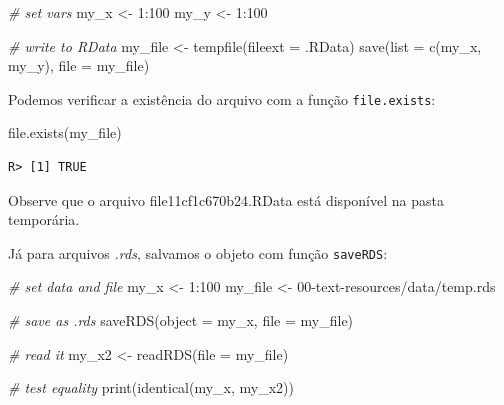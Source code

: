\documentclass[
  11pt,
]{book}
\newenvironment{Shaded}{\begin{snugshade}}{\end{snugshade}}
\newcommand{\AttributeTok}[1]{\textcolor[rgb]{0.61,0.61,0.61}{#1}}
\newcommand{\CommentTok}[1]{\textcolor[rgb]{0.37,0.37,0.37}{\textit{#1}}}
\newcommand{\DecValTok}[1]{\textcolor[rgb]{0.06,0.06,0.06}{#1}}
\newcommand{\FunctionTok}[1]{\textcolor[rgb]{0,0,0}{#1}}
\newcommand{\NormalTok}[1]{#1}
\newcommand{\OtherTok}[1]{\textcolor[rgb]{0.37,0.37,0.37}{#1}}
\newcommand{\SpecialCharTok}[1]{\textcolor[rgb]{0,0,0}{#1}}
\newcommand{\StringTok}[1]{\textcolor[rgb]{0.5,0.5,0.5}{#1}}
\begin{document}
\begin{Shaded}
\begin{Highlighting}[]
\CommentTok{\# set vars}
\NormalTok{my\_x }\OtherTok{\textless{}{-}} \DecValTok{1}\SpecialCharTok{:}\DecValTok{100}
\NormalTok{my\_y }\OtherTok{\textless{}{-}} \DecValTok{1}\SpecialCharTok{:}\DecValTok{100}

\CommentTok{\# write to RData}
\NormalTok{my\_file }\OtherTok{\textless{}{-}} \FunctionTok{tempfile}\NormalTok{(}\AttributeTok{fileext =} \StringTok{\textquotesingle{}.RData\textquotesingle{}}\NormalTok{)}
\FunctionTok{save}\NormalTok{(}\AttributeTok{list =} \FunctionTok{c}\NormalTok{(}\StringTok{\textquotesingle{}my\_x\textquotesingle{}}\NormalTok{, }\StringTok{\textquotesingle{}my\_y\textquotesingle{}}\NormalTok{),}
     \AttributeTok{file =}\NormalTok{ my\_file)}
\end{Highlighting}
\end{Shaded}

Podemos verificar a existência do arquivo com a função \texttt{file.exists}:

\begin{Shaded}
\begin{Highlighting}[]
\FunctionTok{file.exists}\NormalTok{(my\_file)}
\end{Highlighting}
\end{Shaded}

\begin{verbatim}
R> [1] TRUE
\end{verbatim}

Observe que o arquivo file11cf1c670b24.RData está disponível na pasta temporária.

Já para arquivos \emph{.rds}, salvamos o objeto com função \texttt{saveRDS}:

\begin{Shaded}
\begin{Highlighting}[]
\CommentTok{\# set data and file}
\NormalTok{my\_x }\OtherTok{\textless{}{-}} \DecValTok{1}\SpecialCharTok{:}\DecValTok{100}
\NormalTok{my\_file }\OtherTok{\textless{}{-}} \StringTok{\textquotesingle{}00{-}text{-}resources/data/temp.rds\textquotesingle{}}

\CommentTok{\# save as .rds}
\FunctionTok{saveRDS}\NormalTok{(}\AttributeTok{object =}\NormalTok{ my\_x,}
        \AttributeTok{file =}\NormalTok{ my\_file)}

\CommentTok{\# read it}
\NormalTok{my\_x2 }\OtherTok{\textless{}{-}} \FunctionTok{readRDS}\NormalTok{(}\AttributeTok{file =}\NormalTok{ my\_file)}

\CommentTok{\# test equality}
\FunctionTok{print}\NormalTok{(}\FunctionTok{identical}\NormalTok{(my\_x, my\_x2))}
\end{Highlighting}
\end{Shaded}
\end{document}
